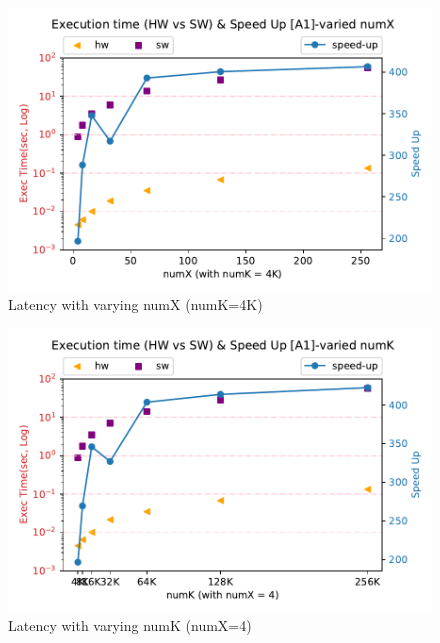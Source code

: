 \begin{figure}[h!]
    \centering
    \includegraphics[width=\columnwidth]{figures/a1-vary-x}
    \caption{Latency with varying numX (numK=4K)}
    \label{fig-a1-x}
\end{figure}

\begin{figure}[h!]
    \centering
    \includegraphics[width=\columnwidth]{figures/a1-vary-k}
    \caption{Latency with varying numK (numX=4)}
    \label{fig-a1-k}
\end{figure}
